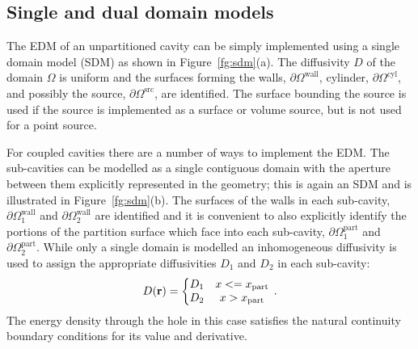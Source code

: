 \documentclass[a4paper]{article}
\numberwithin{equation}{section}
\newcounter{Figure}
\begin{document}
\subsection[Single and dual domain models]{Single and dual domain models}
\label{sc:tcs:sddm}

The EDM of an unpartitioned cavity can be simply implemented using a single domain model (SDM)
as shown in Figure~\ref{fg:sdm}(a). The diffusivity $D$ of the domain $\Omega$ is uniform and
the surfaces forming the walls, $\partial\Omega^\mathrm{wall}$, cylinder, $\partial\Omega^\mathrm{cyl}$, and 
possibly the source, $\partial\Omega^\mathrm{src}$, are identified. The surface bounding the source is 
used if the source is implemented as a surface or volume source, but is not used for a point source.

For coupled cavities there are a number of ways to implement the EDM. The sub-cavities can
be modelled as a single contiguous domain with the aperture between them explicitly represented in 
the geometry; this is again an SDM and is illustrated in Figure~\ref{fg:sdm}(b). The surfaces
of the walls in each sub-cavity, $\partial\Omega^\mathrm{wall}_1$ and $\partial\Omega^\mathrm{wall}_2$ are identified
and it is convenient to also explicitly identify the portions of the partition surface which face into
each sub-cavity, $\partial\Omega^\mathrm{part}_1$ and $\partial\Omega^\mathrm{part}_2$. While only a single domain
is modelled an inhomogeneous diffusivity is used to assign the appropriate diffusivities $D_1$ and
$D_2$ in each sub-cavity:
\begin{align}
D(\boldsymbol{\mathrm{r}}) = \left\{ 
\begin{matrix}
D_1    &x <= x_\mathrm{part} \\
D_2    &x > x_\mathrm{part} 
\end{matrix}
\right.\,.
\end{align}
The energy density through the hole in this case satisfies the natural continuity boundary conditions
for its value and derivative.
\end{document}
